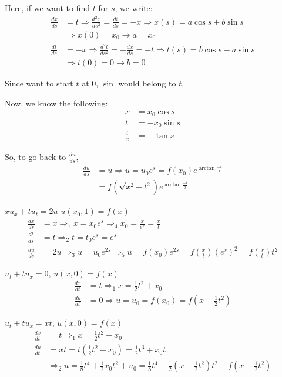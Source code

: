 \documentclass{article}
\begin{document}
Here, if we want to find $t$ for $s$, we write:
%
\begin{align}
  \frac{dx}{ds} & = t \Rightarrow \frac{d^2x}{ds^2} = \frac{dt}{ds} = -x
  \Rightarrow x(s) = a \cos s + b \sin s\\
  & \Rightarrow x(0) = x_0 \rightarrow a = x_0\\
  \frac{dt}{ds} & = -x \Rightarrow \frac{d^2t}{ds^2} = -\frac{dx}{ds} = -t
  \Rightarrow t(s) = b \cos s - a \sin s\\
  & \Rightarrow t(0) = 0 \rightarrow b = 0
\end{align}

Since want to start $t$ at $0$, $\sin$ would belong to $t$.

Now, we know the following:
%
\begin{align}
  x & = x_0 \cos s\\
  t & = -x_0 \sin s\\
  \frac{t}{x} & = - \tan s
\end{align}

So, to go back to $\frac{du}{ds}$,
%
\begin{align}
  \frac{du}{ds} & = u \Rightarrow u = u_0 e^s
  = f(x_0) e^{\arctan \frac{-t}{x}}\\
  & = f\left( \sqrt{x^2 + t^2} \right) e^{\arctan \frac{-t}{x}}
\end{align}

\ex $xu_x + tu_t = 2u$ \quad $u(x_0, 1) = f(x)$
\begin{align}
  \frac{dx}{ds} & = x \Rightarrow_1 x = x_0 e^s \Rightarrow_4 x_0
  = \frac{x}{e^s} = \frac{x}{t}\\
  \frac{dt}{ds} & = t \Rightarrow_2 t = t_0 e^s = e^s\\
  \frac{du}{ds} & = 2u \Rightarrow_3 u = u_0 e^{2s}
  \Rightarrow_5 u = f(x_0) e^{2s} = f\left(\frac{x}{t}\right)(e^s)^2
  = f\left(\frac{x}{t}\right)t^2
\end{align}

\ex $u_t + tu_x = 0$, $u(x, 0) = f(x)$
%
\begin{align}
  \frac{dx}{dt} & = t \Rightarrow_1 x = \frac{1}{2}t^2 + x_0\\
  \frac{du}{dt} & = 0 \Rightarrow u = u_0 = f(x_0) = f\left(x - \frac{1}{2} t^2\right)
\end{align}

\ex $u_t + tu_x = xt$, $u(x, 0) = f(x)$
%
\begin{align}
  \frac{dx}{dt} & = t \Rightarrow_1 x = \frac{1}{2} t^2 + x_0\\
  \frac{du}{dt} & = xt = t\left(\frac{1}{2}t^2 + x_0\right)
  = \frac{1}{2} t^3 + x_0 t\\
  & \Rightarrow_2 u = \frac{1}{8} t^4 + \frac{1}{2} x_0 t^2 + u_0
  = \frac{1}{8} t^4 + \frac{1}{2} \left(x - \frac{1}{2} t^2\right)t^2 +
  f\left(x - \frac{1}{2} t^2 \right)
\end{align}
\end{document}
